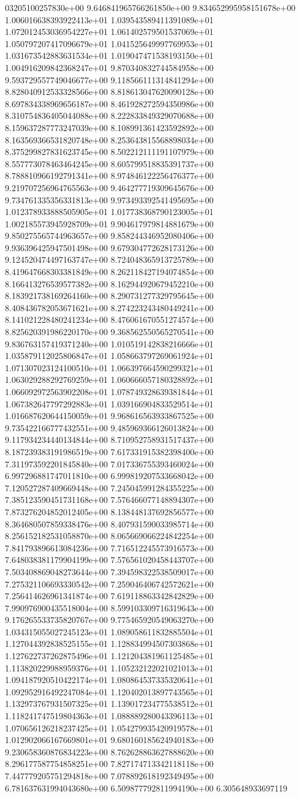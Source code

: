 03205100257830e+00	9.646841965766261850e+00	9.834652995958151678e+00	1.006016638393922413e+01	1.039543589411391089e+01	1.072012453036954227e+01	1.061402579501537069e+01	1.050797207417096679e+01	1.041525649997769953e+01	1.031673542883631534e+01	1.019047471538193150e+01	1.004916209842368247e+01	9.870340832744584958e+00	9.593729557749046677e+00	9.118566111314841294e+00	8.828040912533328566e+00	8.818613047620090128e+00	8.697834338969656187e+00	8.461928272594350986e+00	8.310754836405044088e+00	8.222833849329070688e+00	8.159637287773247039e+00	8.108991361423592892e+00	8.163569366531820748e+00	8.253643815568898034e+00	8.375299827831623745e+00	8.502212111191107979e+00	8.557773078463464245e+00	8.605799518835391737e+00	8.788810966192791341e+00	8.974846122256476377e+00	9.219707256964765563e+00	9.464277719309645676e+00	9.734761335356331813e+00	9.973493392541495695e+00	1.012378933888505905e+01	1.017738368790123005e+01	1.002185573945928709e+01	9.904617979814881679e+00	9.850275565744963657e+00	9.858244346952080406e+00	9.936396425947501498e+00	9.679304772628173126e+00	9.124520474497163747e+00	8.724048365913725789e+00	8.419647668303381849e+00	8.262118427194074854e+00	8.166413276539577382e+00	8.162944920679452210e+00	8.183921738169264160e+00	8.290731277329795645e+00	8.408436782053671621e+00	8.274223243480449241e+00	8.141021228480241234e+00	8.476061670551274574e+00	8.825620391986220170e+00	9.368562550565270541e+00	9.836763157419371240e+00	1.010519142838216666e+01	1.035879112025806847e+01	1.058663797269061924e+01	1.071307023124100510e+01	1.066397664590299321e+01	1.063029288292769259e+01	1.060666057180328892e+01	1.066092972563902208e+01	1.078749328639381844e+01	1.067382647797292883e+01	1.039166904833529514e+01	1.016687620644150059e+01	9.968616563933867525e+00	9.735422166777432551e+00	9.485969366126013824e+00	9.117934234440134844e+00	8.710952758931517437e+00	8.187239383191986519e+00	7.617331915382398400e+00	7.311973592201845840e+00	7.017336755393460024e+00	6.997296881747011810e+00	6.999819207533668042e+00	7.120527287409669448e+00	7.245045991284355225e+00	7.385123590451731168e+00	7.576466077148894307e+00	7.873276204852012405e+00	8.138448137692856577e+00	8.364680507859338476e+00	8.407931590033985714e+00	8.256152182531058870e+00	8.065669066224842254e+00	7.841793896613084236e+00	7.716512245573916573e+00	7.648038381179904199e+00	7.576561020458443707e+00	7.503408869048273644e+00	7.394598322538509017e+00	7.275321106693330542e+00	7.259046406742572621e+00	7.256414626961341874e+00	7.619118863342842829e+00	7.990976900435518004e+00	8.599103309716319643e+00	9.176265533735820767e+00	9.775465920549063270e+00	1.034315055027245123e+01	1.089058611832885504e+01	1.127044392838525155e+01	1.128834994507303868e+01	1.127622737262875496e+01	1.121204381961125485e+01	1.113820229988959376e+01	1.105232122021021013e+01	1.094187920510422174e+01	1.080864537335320641e+01	1.092952916492247084e+01	1.120402013897743565e+01	1.132973767931507325e+01	1.139017234775538512e+01	1.118241747519804363e+01	1.088889280043396113e+01	1.070656126218237425e+01	1.054279935420919578e+01	1.012902066167669801e+01	9.680160185624940183e+00	9.230658360876834223e+00	8.762628863627888620e+00	8.296177587754858251e+00	7.827174713342118118e+00	7.447779205751294818e+00	7.078892618192349495e+00	6.781637631994043680e+00	6.509877792811994190e+00	6.305648933697119